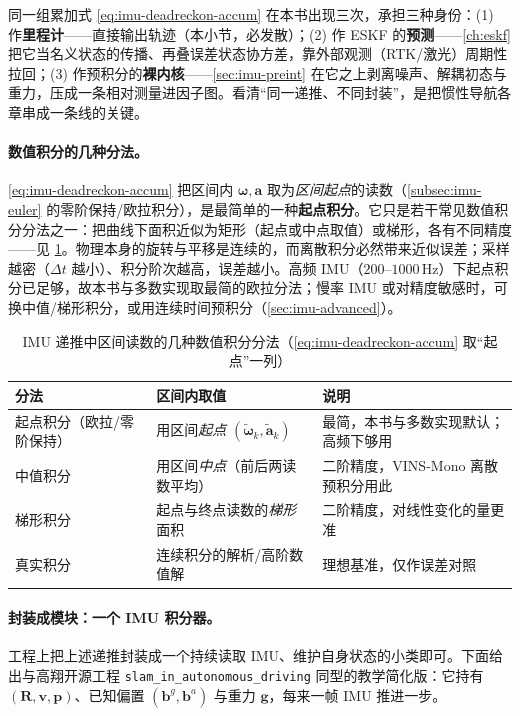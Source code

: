 \begin{insight}\label{ins:imu-deadreckon-module}
同一组累加式 \cref{eq:imu-deadreckon-accum} 在本书出现三次，承担三种身份：(1) 作\textbf{里程计}——直接输出轨迹（本小节，必发散）；(2) 作 ESKF 的\textbf{预测}——\cref{ch:eskf} 把它当名义状态的传播、再叠误差状态协方差，靠外部观测（RTK/激光）周期性拉回；(3) 作预积分的\textbf{裸内核}——\cref{sec:imu-preint} 在它之上剥离噪声、解耦初态与重力，压成一条相对测量进因子图。看清“同一递推、不同封装”，是把惯性导航各章串成一条线的关键。
\end{insight}

\paragraph{数值积分的几种分法。}
\cref{eq:imu-deadreckon-accum} 把区间内 $\boldsymbol\omega,\mathbf a$ 取为\emph{区间起点}的读数（\cref{subsec:imu-euler} 的零阶保持/欧拉积分），是最简单的一种\textbf{起点积分}。它只是若干常见数值积分分法之一：把曲线下面积近似为矩形（起点或中点取值）或梯形，各有不同精度——见 \cref{tab:imu-integ-schemes}\cite{gao2023slamad}。物理本身的旋转与平移是连续的，而离散积分必然带来近似误差；采样越密（$\Delta t$ 越小）、积分阶次越高，误差越小。高频 IMU（$200$--$1000\,\mathrm{Hz}$）下起点积分已足够，故本书与多数实现取最简的欧拉分法；慢率 IMU 或对精度敏感时，可换中值/梯形积分，或用连续时间预积分（\cref{sec:imu-advanced}）。

\begin{table}[H]\centering\small
\caption{IMU 递推中区间读数的几种数值积分分法（\cref{eq:imu-deadreckon-accum} 取“起点”一列\cite{gao2023slamad}）}
\label{tab:imu-integ-schemes}
\begin{tabular}{lll}
\toprule
分法 & 区间内取值 & 说明 \\
\midrule
起点积分（欧拉/零阶保持）& 用区间\emph{起点} $(\tilde{\boldsymbol\omega}_k,\tilde{\mathbf a}_k)$ & 最简，本书与多数实现默认；高频下够用 \\
中值积分 & 用区间\emph{中点}（前后两读数平均）& 二阶精度，VINS-Mono 离散预积分用此 \\
梯形积分 & 起点与终点读数的\emph{梯形}面积 & 二阶精度，对线性变化的量更准 \\
真实积分 & 连续积分的解析/高阶数值解 & 理想基准，仅作误差对照 \\
\bottomrule
\end{tabular}
\end{table}

\paragraph{封装成模块：一个 IMU 积分器。}
工程上把上述递推封装成一个持续读取 IMU、维护自身状态的小类即可。下面给出与高翔开源工程 \texttt{slam\_in\_autonomous\_driving} 同型的教学简化版\cite{gao2023slamad}：它持有 $(\mathbf R,\mathbf v,\mathbf p)$、已知偏置 $(\mathbf b^g,\mathbf b^a)$ 与重力 $\mathbf g$，每来一帧 IMU 推进一步。


